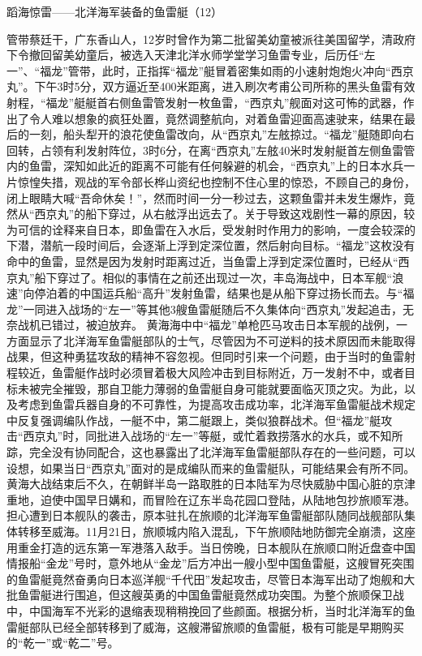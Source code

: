 \documentclass[12pt,UTF8]{ctexbook}
\begin{document}
蹈海惊雷——北洋海军装备的鱼雷艇（12）

管带蔡廷干，广东香山人，12岁时曾作为第二批留美幼童被派往美国留学，清政府下令撤回留美幼童后，被选入天津北洋水师学堂学习鱼雷专业，后历任“左一”、“福龙”管带，此时，正指挥“福龙”艇冒着密集如雨的小速射炮炮火冲向“西京丸”。下午3时5分，双方逼近至400米距离，进入刷次考甫公司所称的黑头鱼雷有效射程，“福龙”艇艇首右侧鱼雷管发射一枚鱼雷，“西京丸”舰面对这可怖的武器，作出了令人难以想象的疯狂处置，竟然调整航向，对着鱼雷迎面高速驶来，结果在最后的一刻，船头犁开的浪花使鱼雷改向，从“西京丸”左舷掠过。“福龙”艇随即向右回转，占领有利发射阵位，3时6分，在离“西京丸”左舷40米时发射艇首左侧鱼雷管内的鱼雷，深知如此近的距离不可能有任何躲避的机会，“西京丸”上的日本水兵一片惊惶失措，观战的军令部长桦山资纪也控制不住心里的惊恐，不顾自己的身份，闭上眼睛大喊“吾命休矣！”，然而时间一分一秒过去，这颗鱼雷并未发生爆炸，竟然从“西京丸”的船下穿过，从右舷浮出远去了。关于导致这戏剧性一幕的原因，较为可信的诠释来自日本，即鱼雷在入水后，受发射时作用力的影响，一度会较深的下潜，潜航一段时间后，会逐渐上浮到定深位置，然后射向目标。“福龙”这枚没有命中的鱼雷，显然是因为发射时距离过近，当鱼雷上浮到定深位置时，已经从“西京丸”船下穿过了。相似的事情在之前还出现过一次，丰岛海战中，日本军舰“浪速”向停泊着的中国运兵船“高升”发射鱼雷，结果也是从船下穿过扬长而去。与“福龙”一同进入战场的“左一”等其他3艘鱼雷艇随后不久集体向“西京丸”发起追击，无奈战机已错过，被迫放弃。
黄海海中中“福龙”单枪匹马攻击日本军舰的战例，一方面显示了北洋海军鱼雷艇部队的士气，尽管因为不可逆料的技术原因而未能取得战果，但这种勇猛攻敌的精神不容忽视。但同时引来一个问题，由于当时的鱼雷射程较近，鱼雷艇作战时必须冒着极大风险冲击到目标附近，万一发射不中，或者目标未被完全摧毁，那自卫能力薄弱的鱼雷艇自身可能就要面临灭顶之灾。为此，以及考虑到鱼雷兵器自身的不可靠性，为提高攻击成功率，北洋海军鱼雷艇战术规定中反复强调编队作战，一艇不中，第二艇跟上，类似狼群战术。但“福龙”艇攻击“西京丸”时，同批进入战场的“左一”等艇，或忙着救捞落水的水兵，或不知所踪，完全没有协同配合，这也暴露出了北洋海军鱼雷艇部队存在的一些问题，可以设想，如果当日“西京丸”面对的是成编队而来的鱼雷艇队，可能结果会有所不同。
黄海大战结束后不久，在朝鲜半岛一路取胜的日本陆军为尽快威胁中国心脏的京津重地，迫使中国早日媾和，而冒险在辽东半岛花园口登陆，从陆地包抄旅顺军港。担心遭到日本舰队的袭击，原本驻扎在旅顺的北洋海军鱼雷艇部队随同战舰部队集体转移至威海。11月21日，旅顺城内陷入混乱，下午旅顺陆地防御完全崩溃，这座用重金打造的远东第一军港落入敌手。当日傍晚，日本舰队在旅顺口附近盘查中国情报船“金龙”号时，意外地从“金龙”后方冲出一艘小型中国鱼雷艇，这艘冒死突围的鱼雷艇竟然奋勇向日本巡洋舰“千代田”发起攻击，尽管日本海军出动了炮舰和大批鱼雷艇进行围追，但这艘英勇的中国鱼雷艇竟然成功突围。为整个旅顺保卫战中，中国海军不光彩的退缩表现稍稍挽回了些颜面。根据分析，当时北洋海军的鱼雷艇部队已经全部转移到了威海，这艘滞留旅顺的鱼雷艇，极有可能是早期购买的“乾一”或“乾二”号。
\end{document}
